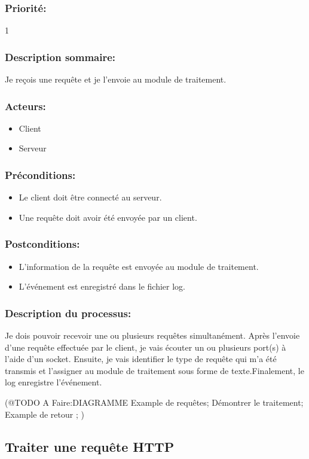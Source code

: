 \documentclass{scrreprt}
\begin{document}
\subsubsection{Priorité:} 1
\subsubsection{Description sommaire:} Je reçois une requête et je l'envoie au module de traitement.
\subsubsection{Acteurs:}
\begin{itemize}
    \item Client
    \item Serveur
\end{itemize}
\subsubsection{Préconditions:}
\begin{itemize}
	\item Le client doit être connecté au serveur.
    \item Une requête doit avoir été envoyée par un client.
\end{itemize} 
\subsubsection{Postconditions:}
\begin{itemize}
    \item  L'information de la requête est envoyée au module de traitement.
    \item  L'événement est enregistré dans le fichier log.
\end{itemize} 
\subsubsection{Description du processus:}
Je dois pouvoir recevoir une ou plusieurs requêtes simultanément. Après l'envoie d'une requête effectuée par le client, je vais écouter un ou plusieurs port(s) à l'aide d'un socket. Ensuite, je vais identifier le type de requête qui m'a été transmis et l'assigner au module de traitement sous forme de texte.Finalement, le log enregistre l'événement.


(@TODO A Faire:DIAGRAMME
Example de requêtes;
Démontrer le traitement;
Example de retour ;
)


\subsection{Traiter une requête HTTP}
\end{document}
